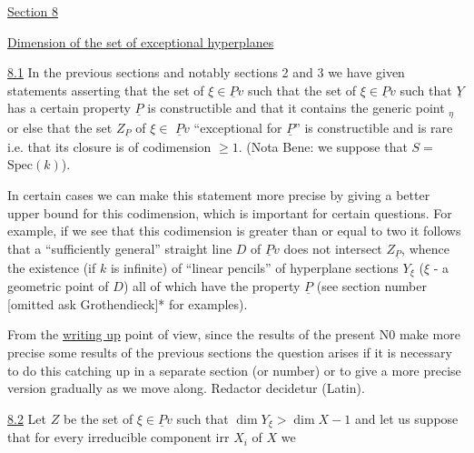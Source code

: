 
\uline{Section 8}

\uline{Dimension of the set of exceptional hyperplanes}

\uline{8.1} In the previous sections and notably sections 2 and 3 we have
given statements asserting that the set of $\xi \in \underline{P}v$ such that the set
of $\xi \in \underline{P}v$ such that $\underline{Y}$ has a certain property $\underline{P}$ is constructible and
that it contains the generic point ${}_{\eta}$ or else that the set $Z_{\underline{P}}$ of $\xi \in$
$\underline{P}v$ ``exceptional for $\underline{P}$'' is constructible and is rare i.e. that its
closure is of codimension $\geq 1$.  (Nota Bene:  we suppose that $S =$
$\mathrm{Spec}(k)$).

In certain cases we can make this statement more precise by
giving a better upper bound for this codimension, which is
important for certain questions.  For example, if we see that this
codimension is greater than or equal to two it follows that a
``sufficiently general'' straight line $D$ of $\underline{P}v$ does not intersect $Z_{\underline{P}}$,
whence the existence (if $k$ is infinite) of ``linear pencils'' of
hyperplane sections $Y_{\xi}$ ($\xi$ - a geometric point of $D$) all of which
have the property $\underline{P}$ (see section number [omitted ask
Grothendieck]* for examples).

From the \uline{writing up} point of view, since the results of the
present N0 make more precise some results of the previous sections
the question arises if it is necessary to do this catching up in a
separate section (or number) or to give a more precise version
gradually as we move along.  Redactor decidetur (Latin).

\uline{8.2} Let $Z$ be the set of $\xi \in \underline{P}v$ such that $\dim Y_{\xi} > \dim X - 1$ and
let us suppose that for every irreducible component irr $X_i$ of $X$ we
